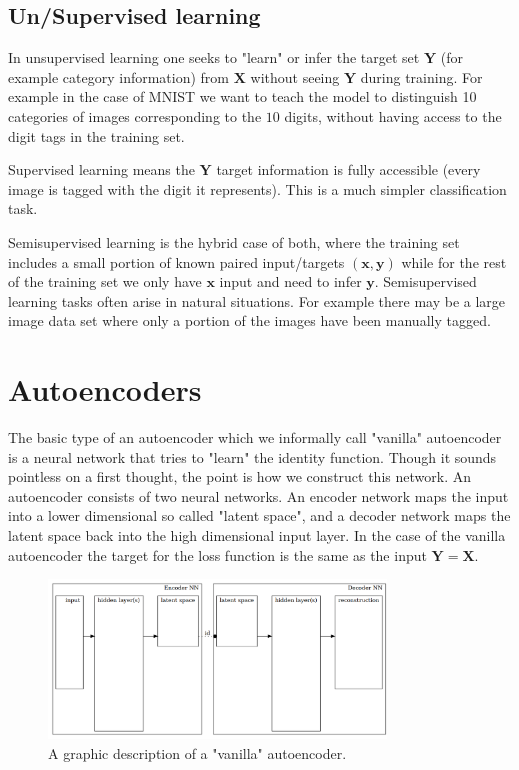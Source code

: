 \documentclass[11pt, a4paper]{report}
\theoremstyle{plain}
\theoremstyle{definition}
\theoremstyle{remark}
\newcommand{\X}{\mathbf{X}}
\newcommand{\x}{\mathbf{x}}
\newcommand{\Y}{\mathbf{Y}}
\newcommand{\y}{\mathbf{y}}
\begin{document}
\subsection{Un/Supervised learning}

In unsupervised learning one seeks to "learn" or infer the target set $\Y$ (for example
category information) from $\X$ without seeing $\Y$ during training.
For example in the case of MNIST we want to teach the model to distinguish
10 categories of images corresponding to the $10$ digits, without having access
to the digit tags in the training set.

Supervised learning means the $\Y$ target information is fully accessible (every image
is tagged with the digit it represents). This is a much simpler classification
task.

Semisupervised learning is the hybrid case of both, where the training set
includes a small portion of known paired input/targets $(\x,\y)$ while for the
rest of the training set we only have $\x$ input and need to infer $\y$.
Semisupervised learning tasks often arise in natural situations. For example
there may be a large image data set where only a portion of the images have been
manually tagged.

\section{Autoencoders}

The basic type of an autoencoder which we informally call "vanilla" autoencoder
is a neural network that tries to "learn" the identity function. Though it sounds
pointless on a first thought, the point is how we construct this network. An
autoencoder consists of two neural networks.
An encoder network maps the input into a lower dimensional so called "latent
space", and a decoder network maps the latent space back into the high
dimensional input layer.
In the case of the vanilla autoencoder the target for the loss function is the
same as the input $\Y = \X$.

\begin{figure}[h]
\centering
\includegraphics[width=0.8\textwidth]{./plots/autoencoderNN.gv.png}
\caption{
A graphic description of a "vanilla" autoencoder.
}
\label{fig:autoencoder}
\end{figure}
\end{document}
